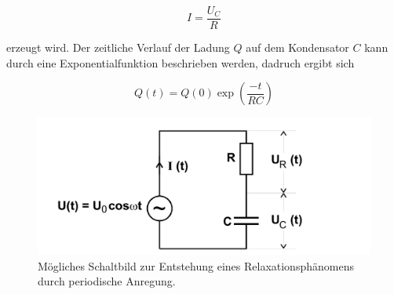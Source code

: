 \begin{equation}
    \label{eq:ohmschesgesetz}
    I = \frac{U_C}{R}
\end{equation}

erzeugt wird. 
Der zeitliche Verlauf der Ladung $Q$ auf dem Kondensator $C$ kann durch eine Exponentialfunktion beschrieben werden, dadruch ergibt sich

\begin{equation}
    \label{eq:entladungsladung}
    Q (t) = Q (0) \exp{\left(\frac{-t}{RC} \right)}
\end{equation}

\begin{figure}
    \centering
    \includegraphics[width=\textwidth/2]{images/schaltung_2.png}
    \caption{Mögliches Schaltbild zur Entstehung eines Relaxationsphänomens durch periodische Anregung.  \cite{V353}}
    \label{fig:schaltung_2}
\end{figure}